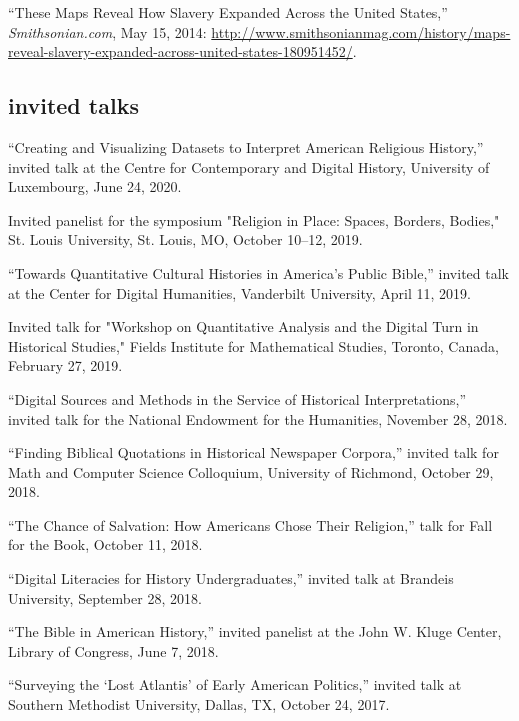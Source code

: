 \documentclass[11pt]{article}
\begin{document}
``These Maps Reveal How Slavery Expanded Across the United States,''
\emph{Smithsonian.com}, May 15, 2014:
\url{http://www.smithsonianmag.com/history/maps-reveal-slavery-expanded-across-united-states-180951452/}.



\subsection{invited talks}\label{invited-talks}

``Creating and Visualizing Datasets to Interpret American Religious History,'' 
invited talk at the  Centre for Contemporary and Digital History, University of Luxembourg, June 24, 2020.

Invited panelist for the symposium "Religion in Place: Spaces, Borders, Bodies," St. Louis University, St. Louis, MO, October 10--12, 2019.

``Towards Quantitative Cultural Histories in America's Public Bible,'' invited talk at the Center for Digital Humanities, Vanderbilt University, April 11, 2019.

Invited talk for "Workshop on Quantitative Analysis and the Digital Turn in Historical Studies," Fields Institute for Mathematical Studies, Toronto, Canada, February 27, 2019.

``Digital Sources and Methods in the Service of Historical Interpretations,'' 
invited talk for the National Endowment for the Humanities, November 28, 
2018.

``Finding Biblical Quotations in Historical Newspaper Corpora,'' invited talk for Math and Computer Science Colloquium, University of Richmond, October 29, 2018.

``The Chance of Salvation: How Americans Chose Their Religion,'' talk for Fall for the Book, October 11, 2018.

``Digital Literacies for History Undergraduates,'' invited talk at Brandeis University, September 28, 2018.

``The Bible in American History,'' invited panelist at the John W. Kluge Center, Library of Congress, June 7, 2018.

``Surveying the `Lost Atlantis' of Early American Politics,'' invited talk at 
Southern Methodist University, Dallas, TX, October 24, 2017.
\end{document}
